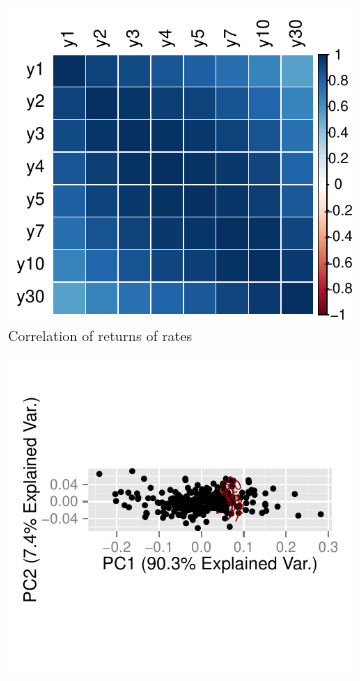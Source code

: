\documentclass[11pt]{scrreprt}
\begin{document}
\begin{figure}[H]
\begin{subfigure}{.3\textwidth}
\centering\includegraphics[]{corrplot-vanilla-returns.pdf}
\caption{Correlation of returns of rates}
\end{subfigure}
\begin{subfigure}{.3\textwidth}
\centering\includegraphics[]{biplot-vanilla-returns.pdf}

\end{subfigure}
\end{figure}
\end{document}
